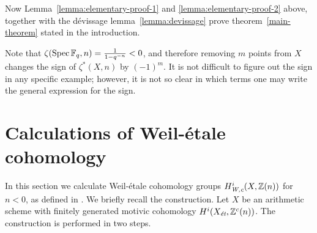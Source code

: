 \documentclass[draft]{article}
\numberwithin{equation}{section}
\begin{document}
Now Lemma~\ref{lemma:elementary-proof-1} and \ref{lemma:elementary-proof-2}
above, together with the d\'{e}vissage lemma~\ref{lemma:devissage} prove
theorem~\ref{main-theorem} stated in the introduction.

\begin{remark}
  Note that $\zeta (\Spec \FF_q, n) = \frac{1}{1 - q^{-n}} < 0$, and therefore
  removing $m$ points from $X$ changes the sign of $\zeta^* (X,n)$ by
  $(-1)^m$. It is not difficult to figure out the sign in any specific example;
  however, it is not so clear in which terms one may write the general
  expression for the sign.
\end{remark}


\section{Calculations of Weil-\'{e}tale cohomology}
\label{sec:Weil-etale-cohomology-of-X}

In this section we calculate Weil-\'{e}tale cohomology groups $H^i_\Wc (X, \ZZ(n))$
for $n < 0$, as defined in \cite{Beshenov-Weil-etale-1}. We briefly recall the
construction. Let $X$ be an arithmetic scheme with finitely generated motivic
cohomology $H^i (X_\et, \ZZ^c(n))$. The construction is performed in two steps.
\end{document}
